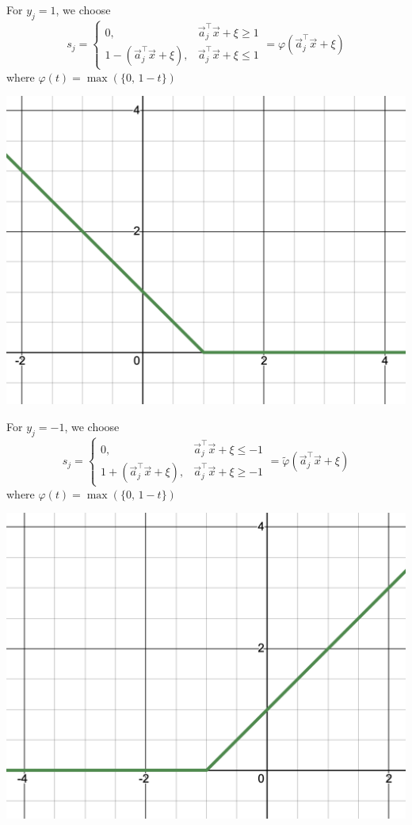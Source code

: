\documentclass{article}
\begin{document}
For $y_j = 1$, we choose
\[
    s_j = \begin{cases}
        0, & \vec{a}_j^\top\vec{x} + \xi \geq 1 \\
        1 - \left(\vec{a}_j^\top \vec{x} + \xi\right), & \vec{a}_j^\top\vec{x} + \xi \leq 1
    \end{cases} = \varphi\left(\vec{a}_j^\top\vec{x} + \xi\right)
\]
where $\varphi(t) = \max(\{0,\, 1 - t\})$
\begin{center}
    \includegraphics*[scale=0.4]{phi.png}
\end{center}
For $y_j = -1$, we choose
\[
    s_j = \begin{cases}
        0, & \vec{a}_j^\top\vec{x} + \xi \leq -1 \\
        1 + \left(\vec{a}_j^\top \vec{x} + \xi\right), & \vec{a}_j^\top\vec{x} + \xi \geq -1
    \end{cases} = \widetilde{\varphi}\left(\vec{a}_j^\top\vec{x} + \xi\right)
\]
where $\varphi(t) = \max(\{0,\, 1 - t\})$
\begin{center}
    \includegraphics*[scale=0.4]{phi_tilde.png}
\end{center}
\end{document}

